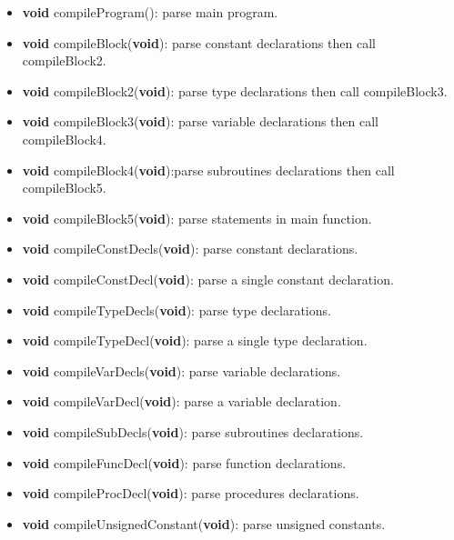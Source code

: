 \documentclass[12pt, a4paper]{report}
\begin{document}
			\begin{itemize}
				\item \textbf{void} compileProgram(): parse main program.
      			\item \textbf{void} compileBlock(\textbf{void}): parse constant declarations then call compileBlock2.
      			\item \textbf{void} compileBlock2(\textbf{void}): parse type declarations then call compileBlock3.
      			\item \textbf{void} compileBlock3(\textbf{void}): parse variable declarations then call compileBlock4.
      			\item \textbf{void} compileBlock4(\textbf{void}):parse subroutines declarations then call compileBlock5.
      			\item \textbf{void} compileBlock5(\textbf{void}): parse statements in main function.
      			\item \textbf{void} compileConstDecls(\textbf{void}): parse constant declarations.
      			\item \textbf{void} compileConstDecl(\textbf{void}): parse a single constant declaration.
      			\item \textbf{void} compileTypeDecls(\textbf{void}): parse type declarations.
      			\item \textbf{void} compileTypeDecl(\textbf{void}): parse a single  type declaration.
      			\item \textbf{void} compileVarDecls(\textbf{void}): parse variable declarations.
      			\item \textbf{void} compileVarDecl(\textbf{void}): parse a variable declaration.
      			\item \textbf{void} compileSubDecls(\textbf{void}): parse subroutines declarations.
      			\item \textbf{void} compileFuncDecl(\textbf{void}): parse function declarations.
     			\item \textbf{void} compileProcDecl(\textbf{void}): parse procedures declarations.
      			\item \textbf{void} compileUnsignedConstant(\textbf{void}): parse unsigned constants.
      			

\end{itemize}
\end{document}
